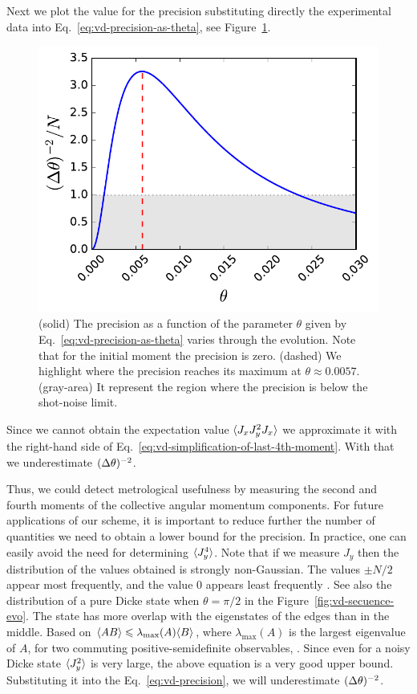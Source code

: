 Next we plot the value for the precision substituting directly the experimental data into Eq.~\eqref{eq:vd-precision-as-theta}, see Figure~\ref{fig:vd-precision-theta-experiment}.
\begin{figure}[htp]
  \centering
  \includegraphics[scale=.65]{img/plots/VD_precision_theta.pdf}
  \caption[Evolution of the precision for $\theta$.]{(solid) The precision as a function of the parameter $\theta$ given by Eq.~\eqref{eq:vd-precision-as-theta} varies through the evolution.
  Note that for the initial moment the precision is zero.
  (dashed) We highlight where the precision reaches its maximum at $\theta \approx 0.0057$.
  (gray-area) It represent the region where the precision is below the shot-noise limit.}
  \label{fig:vd-precision-theta-experiment}
\end{figure}
Since we cannot obtain the expectation value $\langle{J_xJ_y^2J_x}\rangle$ we approximate it with the right-hand side of Eq.~\eqref{eq:vd-simplification-of-last-4th-moment}.
With that we underestimate $(\Delta \theta )^{-2}$.

Thus, we could detect metrological usefulness by measuring the second and fourth moments of the collective angular momentum components.
For future applications of our scheme, it is important to reduce further the number of quantities we need to obtain a lower bound for the precision.
In practice, one can easily avoid the need for determining $\langle{J_y^4}\rangle$.
Note that if we measure $J_y$ then the distribution of the values obtained is strongly non-Gaussian.
The values $\pm N/2$ appear most frequently, and the value 0 appears least frequently \cite{Luecke2011}.
See also the distribution of a pure Dicke state when $\theta=\pi/2$ in the Figure~\ref{fig:vd-secuence-evo}.
The state has more overlap with the eigenstates of the edges than in the middle.
Based on $\langle{AB}\rangle\leqslant\lambda_{\max}(A)\langle{B}\rangle$, where $\lambda_{\max}(A)$ is the largest eigenvalue of $A$, for two commuting positive-semidefinite observables,
\be
  \leqslant{}.
\ee
Since even for a noisy Dicke state $\langle{J_y^2}\rangle$ is very large, the above equation is a very good upper bound.
Substituting it into the Eq.~\eqref{eq:vd-precision}, we will underestimate $(\Delta \theta )^{-2}$.

